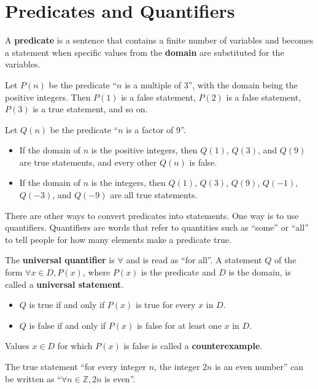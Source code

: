 \section{Predicates and Quantifiers}
\begin{definition}
    A \textbf{predicate} is a sentence that contains a finite number of variables and becomes a statement when specific values from the \textbf{domain} are substituted for the variables.
\end{definition}
\begin{example}
    Let $P(n)$ be the predicate ``$n$ is a multiple of 3'', with the domain being the positive integers. Then $P(1)$ is a false statement, $P(2)$ is a false statement, $P(3)$ is a true statement, and so on.
\end{example}
\begin{example}
    Let $Q(n)$ be the predicate ``$n$ is a factor of 9''.
    \begin{itemize}
        \item If the domain of $n$ is the positive integers, then $Q(1)$, $Q(3)$, and $Q(9)$ are true statements, and every other $Q(n)$ is false.
        \item If the domain of $n$ is the integers, then $Q(1)$, $Q(3)$, $Q(9)$, $Q(-1)$, $Q(-3)$, and $Q(-9)$ are all true statements.
    \end{itemize}
\end{example}

There are other ways to convert predicates into statements. One way is to use quantifiers. Quantifiers are words that refer to quantities such as ``some'' or ``all'' to tell people for how many elements make a predicate true.
\begin{definition}
    The \textbf{universal quantifier} is $\forall$ and is read as ``for all''. A statement $Q$ of the form $\forall x \in D, P(x)$, where $P(x)$ is the predicate and $D$ is the domain, is called a \textbf{universal statement}.
    \begin{itemize}
        \item $Q$ is true if and only if $P(x)$ is true for every $x$ in $D$.
        \item $Q$ is false if and only if $P(x)$ is false for at least one $x$ in $D$.
    \end{itemize}
    Values $x \in D$ for which $P(x)$ is false is called a \textbf{counterexample}.
\end{definition}
\begin{example}
    The true statement ``for every integer $n$, the integer $2n$ is an even number'' can be written as ``$\forall n \in \mathbb{Z}, 2n$ is even''.
\end{example}

